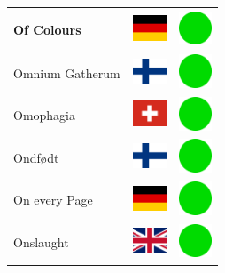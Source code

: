 \documentclass[12pt, a4paper, twoside]{report}
\begin{document}
\begin{center}
\begin{longtable}{|p{5cm}|p{2cm}|p{2cm}|}
 Of Colours                                                 & \includegraphics[width=1cm]{../img/flags/de} &   \includegraphics[width=1cm]{../likes/y} \\ \hline
 Omnium Gatherum                                            & \includegraphics[width=1cm]{../img/flags/fi} &   \includegraphics[width=1cm]{../likes/y} \\ \hline
 Omophagia                                                  & \includegraphics[width=1cm]{../img/flags/ch} &   \includegraphics[width=1cm]{../likes/y} \\ \hline
 Ondfødt                                                    & \includegraphics[width=1cm]{../img/flags/fi} &   \includegraphics[width=1cm]{../likes/y} \\ \hline
 On every Page                                              & \includegraphics[width=1cm]{../img/flags/de} &   \includegraphics[width=1cm]{../likes/y} \\ \hline
 Onslaught                                                  & \includegraphics[width=1cm]{../img/flags/gb} &   \includegraphics[width=1cm]{../likes/y} \\ \hline

\end{longtable}
\end{center}
\end{document}
